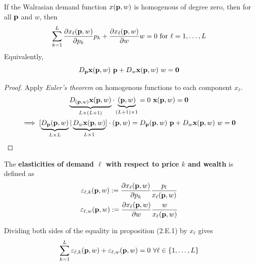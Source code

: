 \documentclass{article}
\begin{document}
 			\begin{proposition}[2.E.1]
 				If the Walrasian demand function $x(\textbf{p}, w)$ is homogenous of degree zero, then for all $\textbf{p}$ and $w$, then
 				\begin{equation}
 					\sum_{k=1}^{L} \frac{\partial x_{\ell}(\textbf{p}, w)}{\partial p_{k}} p_{k}+\frac{\partial x_{\ell}(\textbf{p}, w)}{\partial w} w=0 \text { for } \ell=1, \ldots, L
 				\end{equation}
 				Equivalently,
 				\begin{equation}
 					D_{\textbf{p}} \textbf{x} (\textbf{p}, w)\ \textbf{p} + D_w \textbf{x}(\textbf{p}, w)\ w = \textbf{0}
 				\end{equation}
 				\begin{proof}
 					Apply \emph{Euler's theorem} on homogenous functions to each component $x_\ell$.
 					\begin{gather}
 						\underbrace{D_{(\vep, w)} \vex(\vep, w)}_{L \times (L+1)} \cdot \underbrace{(\vep, w)}_{(L+1) \times 1} = 0\ \vex(\vep, w) = \ve{0} \\
 						\implies [\underbrace{D_{\vep} (\vep, w)}_{L \times L} | \underbrace{D_w \vex(\vep, w)}_{L \times 1}] \cdot (\vep, w) = D_{\vep} (\vep, w)\ \vep + D_w \vex(\vep, w)\ w = \ve{0}
 					\end{gather}
 				\end{proof}
 			\end{proposition}
 			
 			\begin{definition}
 				The \textbf{elasticities of demand $\ell$ with respect to price $k$ and wealth} is defined as 
 				\begin{gather}
 					\varepsilon_{\ell, k} (\textbf{p}, w) := \frac{\partial{x_\ell (\textbf{p}, w)}}{\partial{p_k}} \frac{p_l}{x_\ell (\textbf{p}, w)}\\
 					\varepsilon_{\ell, w} (\textbf{p}, w) := \frac{\partial{x_\ell (\textbf{p}, w)}}{\partial{w}} \frac{w}{x_\ell (\textbf{p}, w)}
 				\end{gather}
 			\end{definition}
 			
  			\begin{corollary}
  				Dividing both sides of the equality in proposition (2.E.1) by $x_{\ell}$ gives
 				\begin{equation}
 					\sum_{k=1}^L \varepsilon_{\ell, k}(\textbf{p}, w) + \varepsilon_{\ell, w}(\textbf{p}, w) = 0\ \forall \ell \in \{1, \ldots, L\}
 				\end{equation}
 			\end{corollary}
 			
\end{document}
